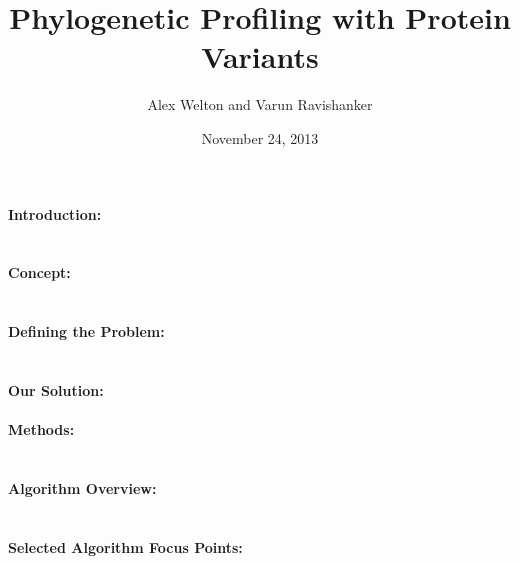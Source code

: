 \documentclass[11pt, oneside]{article}
\title{Phylogenetic Profiling with Protein Variants}
\author{Alex Welton and Varun Ravishanker}
\date{November 24, 2013}
\begin{document}
\maketitle
\pagebreak

\paragraph
{\bfseries Introduction:}

\section{}
\paragraph
{\bfseries Concept:}

\section{}
\paragraph
{\bfseries Defining the Problem:}

\section{}
\paragraph
{\bfseries Our Solution:}

\pagebreak
\paragraph
{\bfseries Methods:}

\section{}
\paragraph
{\bfseries Algorithm Overview:}

\section{}
\paragraph
{\bfseries Selected Algorithm Focus Points:}
\end{document}
